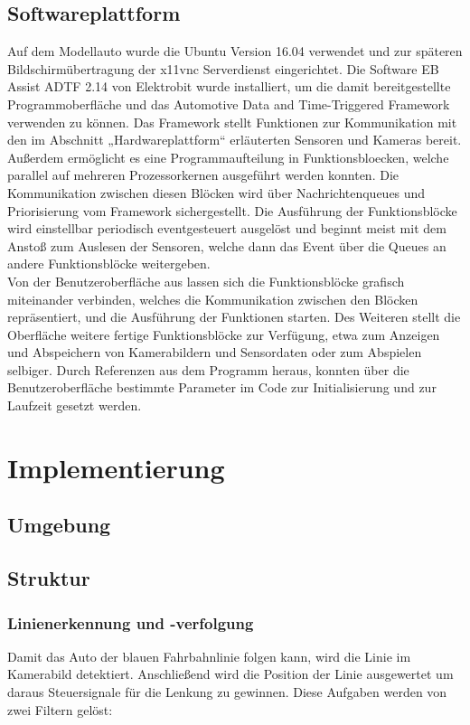 \documentclass[12pt,a4paper]{report}
\begin{document}
\section{Softwareplattform}
Auf dem Modellauto wurde die Ubuntu Version 16.04 verwendet und zur späteren Bildschirmübertragung der x11vnc Serverdienst eingerichtet. Die Software EB Assist ADTF 2.14 von Elektrobit wurde installiert, um die damit bereitgestellte Programmoberfläche und das Automotive Data and Time-Triggered Framework verwenden zu können. Das Framework stellt Funktionen zur Kommunikation mit den im Abschnitt „Hardwareplattform“ erläuterten Sensoren und Kameras bereit. Außerdem ermöglicht es eine Programmaufteilung in Funktionsbloecken, welche parallel auf mehreren Prozessorkernen ausgeführt werden konnten. Die Kommunikation zwischen diesen Blöcken wird über Nachrichtenqueues und Priorisierung vom Framework sichergestellt. Die Ausführung der Funktionsblöcke wird einstellbar periodisch eventgesteuert ausgelöst und beginnt meist mit dem Anstoß zum Auslesen der Sensoren, welche dann das Event über die Queues an andere Funktionsblöcke weitergeben.\\
Von der Benutzeroberfläche aus lassen sich die Funktionsblöcke grafisch miteinander verbinden, welches die Kommunikation zwischen den Blöcken repräsentiert, und die Ausführung der Funktionen starten. Des Weiteren stellt die Oberfläche weitere fertige Funktionsblöcke zur Verfügung, etwa zum Anzeigen und Abspeichern von Kamerabildern und Sensordaten oder zum  Abspielen selbiger. Durch Referenzen aus dem Programm heraus, konnten über die Benutzeroberfläche bestimmte Parameter im Code zur Initialisierung und zur Laufzeit gesetzt werden.

\chapter{Implementierung}

\section{Umgebung}

\section{Struktur}

\subsection{Linienerkennung und -verfolgung}
Damit das Auto der blauen Fahrbahnlinie folgen kann, wird die Linie im Kamerabild detektiert. Anschließend wird die Position der Linie ausgewertet um daraus Steuersignale für die Lenkung zu gewinnen. Diese Aufgaben werden von zwei Filtern gelöst:\\
\end{document}
